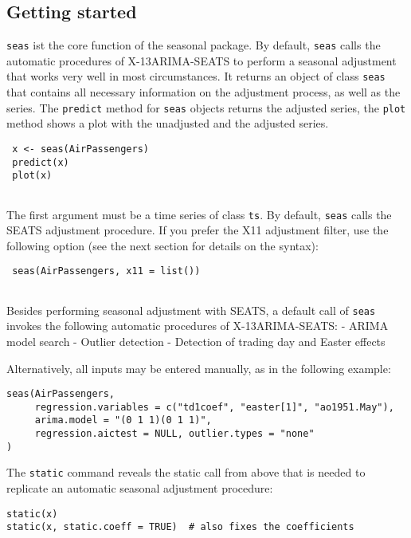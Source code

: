 \subsection{Getting started}\label{getting-started}

\texttt{seas} ist the core function of the seasonal package. By default,
\texttt{seas} calls the automatic procedures of X-13ARIMA-SEATS to
perform a seasonal adjustment that works very well in most
circumstances. It returns an object of class \texttt{seas} that contains
all necessary information on the adjustment process, as well as the
series. The \texttt{predict} method for \texttt{seas} objects returns
the adjusted series, the \texttt{plot} method shows a plot with the
unadjusted and the adjusted series.

\begin{verbatim}
 x <- seas(AirPassengers)
 predict(x)
 plot(x)
 
\end{verbatim}

The first argument must be a time series of class \texttt{ts}. By
default, \texttt{seas} calls the SEATS adjustment procedure. If you
prefer the X11 adjustment filter, use the following option (see the next
section for details on the syntax):

\begin{verbatim}
 seas(AirPassengers, x11 = list())
 
\end{verbatim}

Besides performing seasonal adjustment with SEATS, a default call of
\texttt{seas} invokes the following automatic procedures of
X-13ARIMA-SEATS: - ARIMA model search - Outlier detection - Detection of
trading day and Easter effects

Alternatively, all inputs may be entered manually, as in the following
example:

\begin{verbatim}
seas(AirPassengers,
     regression.variables = c("td1coef", "easter[1]", "ao1951.May"),
     arima.model = "(0 1 1)(0 1 1)",
     regression.aictest = NULL, outlier.types = "none"
)
\end{verbatim}

The \texttt{static} command reveals the static call from above that is
needed to replicate an automatic seasonal adjustment procedure:

\begin{verbatim}
static(x)
static(x, static.coeff = TRUE)  # also fixes the coefficients
\end{verbatim}

